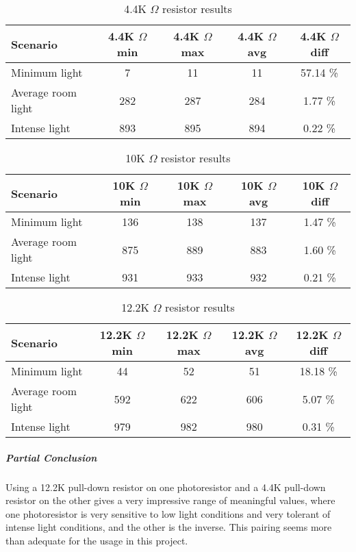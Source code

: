 \begin{table}[H]
  \centering
  \begin{tabular}{l c c c c}
    Scenario & 4.4K $\Omega$ min & 4.4K $\Omega$ max & 4.4K $\Omega$ avg & 4.4K $\Omega$ diff \\
    \hline
    Minimum light & 7 & 11 & 11 & 57.14 \% \\
    Average room light & 282 & 287 & 284 & 1.77 \% \\
    Intense light & 893 & 895 & 894 & 0.22 \% \\
  \end{tabular}
  \caption{4.4K $\Omega$ resistor results}\label{tab:4.4KTestResults}
\end{table}

\begin{table}[H]
  \centering
  \begin{tabular}{l c c c c}
    Scenario & 10K $\Omega$ min & 10K $\Omega$ max & 10K $\Omega$ avg & 10K $\Omega$ diff \\
    \hline
    Minimum light & 136 & 138 & 137 & 1.47 \% \\
    Average room light & 875 & 889 & 883 & 1.60 \% \\
    Intense light & 931 & 933 & 932 & 0.21 \% \\
  \end{tabular}
  \caption {10K $\Omega$ resistor results}\label{tab:10KTestResults}
\end{table}

\begin{table}[H]
  \centering
  \begin{tabular}{l c c c c}
    Scenario & 12.2K $\Omega$ min & 12.2K $\Omega$ max & 12.2K $\Omega$ avg & 12.2K $\Omega$ diff \\
    \hline
    Minimum light & 44 & 52 & 51 & 18.18 \% \\
    Average room light & 592 & 622 & 606 & 5.07 \% \\
    Intense light & 979 & 982 & 980 & 0.31 \% \\
  \end{tabular}
  \caption{12.2K $\Omega$ resistor results}\label{tab:12.2KTestResults}
\end{table}

\subparagraph{Partial Conclusion}
Using a 12.2K pull-down resistor on one photoresistor and a 4.4K pull-down resistor on the other gives a very impressive range of meaningful values, where one photoresistor is very sensitive to low light conditions and very tolerant of intense light conditions, and the other is the inverse. This pairing seems more than adequate for the usage in this project.
